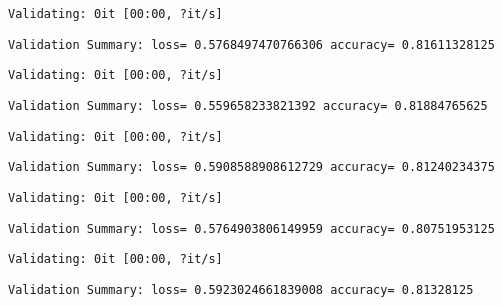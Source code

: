 \documentclass[11pt]{article}
\begin{document}
    
    \begin{Verbatim}[commandchars=\\\{\}]
Validating: 0it [00:00, ?it/s]
    \end{Verbatim}

    
    \begin{Verbatim}[commandchars=\\\{\}]
Validation Summary: loss= 0.5768497470766306 accuracy= 0.81611328125
    \end{Verbatim}

    
    \begin{Verbatim}[commandchars=\\\{\}]
Validating: 0it [00:00, ?it/s]
    \end{Verbatim}

    
    \begin{Verbatim}[commandchars=\\\{\}]
Validation Summary: loss= 0.559658233821392 accuracy= 0.81884765625
    \end{Verbatim}

    
    \begin{Verbatim}[commandchars=\\\{\}]
Validating: 0it [00:00, ?it/s]
    \end{Verbatim}

    
    \begin{Verbatim}[commandchars=\\\{\}]
Validation Summary: loss= 0.5908588908612729 accuracy= 0.81240234375
    \end{Verbatim}

    
    \begin{Verbatim}[commandchars=\\\{\}]
Validating: 0it [00:00, ?it/s]
    \end{Verbatim}

    
    \begin{Verbatim}[commandchars=\\\{\}]
Validation Summary: loss= 0.5764903806149959 accuracy= 0.80751953125
    \end{Verbatim}

    
    \begin{Verbatim}[commandchars=\\\{\}]
Validating: 0it [00:00, ?it/s]
    \end{Verbatim}

    
    \begin{Verbatim}[commandchars=\\\{\}]
Validation Summary: loss= 0.5923024661839008 accuracy= 0.81328125
    \end{Verbatim}
\end{document}
